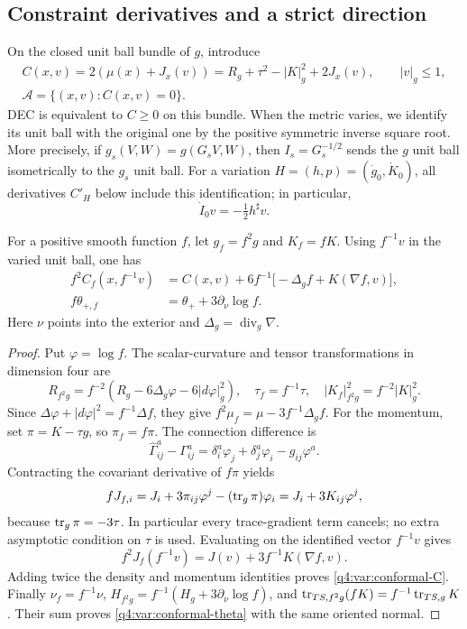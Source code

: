 \subsection{Constraint derivatives and a strict direction}

On the closed unit ball bundle of $g$, introduce
\begin{equation}
\begin{gathered}
 C(x,v)=2(\mu(x)+J_x(v))
       =R_g+\tau^2-|K|_g^2+2J_x(v),\qquad |v|_g\le1,\\
 \mathcal A=\{(x,v):C(x,v)=0\}.
\end{gathered}
\label{q4:var:active-set}
\end{equation}
DEC is equivalent to $C\ge0$ on this bundle. When the metric varies,
we identify its unit ball with the original one by the positive symmetric
inverse square root. More precisely, if
$g_s(V,W)=g(G_sV,W)$, then $I_s=G_s^{-1/2}$ sends the $g$ unit ball
isometrically to the $g_s$ unit ball. For a variation
$H=(h,p)=(\dot g_0,\dot K_0)$, all derivatives $C'_H$ below include this
identification; in particular,
\[
 \dot I_0v=-\tfrac12h^\sharp v.
\]

\begin{lemma}
\label{q4:var:conformal}
For a positive smooth function $f$, let $g_f=f^2g$ and $K_f=fK$.
Using $f^{-1}v$ in the varied unit ball, one has
\begin{align}
 f^2 C_f(x,f^{-1}v)
   &=C(x,v)+6f^{-1}\bigl[-\Delta_g f+K(\nabla f,v)\bigr],
       \label{q4:var:conformal-C}\\
 f\theta_{+,f}
   &=\theta_++3\partial_\nu\log f.
       \label{q4:var:conformal-theta}
\end{align}
Here $\nu$ points into the exterior and $\Delta_g=\operatorname{div}_g\nabla$.
\end{lemma}

\begin{proof}
Put $\varphi=\log f$. The scalar-curvature and tensor transformations in
dimension four are
\[
 R_{f^2g}=f^{-2}(R_g-6\Delta_g\varphi-6|d\varphi|_g^2),
 \quad \tau_f=f^{-1}\tau,
 \quad |K_f|_{f^2g}^2=f^{-2}|K|_g^2.
\]
Since $\Delta\varphi+|d\varphi|^2=f^{-1}\Delta f$, they give
$f^2\mu_f=\mu-3f^{-1}\Delta_gf$. For the momentum, set
$\pi=K-\tau g$, so $\pi_f=f\pi$. The connection difference is
\[
 \widehat\Gamma^a_{ij}-\Gamma^a_{ij}
 =\delta_i^a\varphi_j+\delta_j^a\varphi_i-g_{ij}\varphi^a.
\]
Contracting the covariant derivative of $f\pi$ yields
\[
 fJ_{f,i}=J_i+3\pi_{ij}\varphi^j-(\operatorname{tr}_g\pi)\varphi_i
          =J_i+3K_{ij}\varphi^j,
\]
because $\operatorname{tr}_g\pi=-3\tau$. In particular every trace-gradient term
cancels; no extra asymptotic condition on $\tau$ is used. Evaluating on
the identified vector $f^{-1}v$ gives
\[
 f^2J_f(f^{-1}v)=J(v)+3f^{-1}K(\nabla f,v).
\]
Adding twice the density and momentum identities proves
\eqref{q4:var:conformal-C}. Finally
$\nu_f=f^{-1}\nu$,
$H_{f^2g}=f^{-1}(H_g+3\partial_\nu\log f)$, and
$\operatorname{tr}_{TS,f^2g}(fK)=f^{-1}\operatorname{tr}_{TS,g}K$.
Their sum proves \eqref{q4:var:conformal-theta} with the same oriented
normal.
\end{proof}

